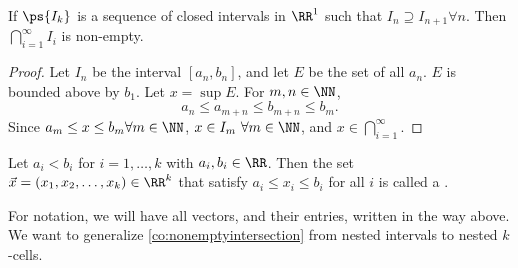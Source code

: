\documentclass[11pt]{scrartcl}
\numberwithin{equation}{section}
\begin{document}
\begin{lemma}
    If $\ps{I_k}$ is a sequence of closed intervals in $\RR^1$
    such that $I_n\supseteq I_{n+1}\forall n$. Then $\bigcap_{i=1}^{\infty}I_i$
    is non-empty.
\end{lemma}

\begin{proof}
    Let $I_n$ be the interval $[a_n,b_n]$, and let $E$ 
    be the set of all $a_n$. $E$ is bounded above by $b_1$.
    Let $x=\sup E$. For $m,n \in \NN$,
    \[ a_n\leq a_{m+n}\leq b_{m+n}\leq b_m.\]
    Since $a_m\leq x\leq b_m\forall m \in \NN$, $x\in I_m\ \forall m\in \NN$,
    and $x\in \bigcap_{i=1}^{\infty}$.
\end{proof}

\begin{definition}
    Let $a_i<b_i$ for $i=1,\dots,k$ with $a_i,b_i\in\RR$. Then the set 
    $\vec{x}=(x_1,x_2,\dots,x_k)\in\RR^k$ that satisfy $a_i\leq x_i\leq b_i$
    for all $i$ is called a .
\end{definition}

For notation, we will have all vectors, and their entries, 
written in the way above.
We want to generalize \cref{co:nonemptyintersection}
from nested intervals to nested $k$-cells.
\end{document}
